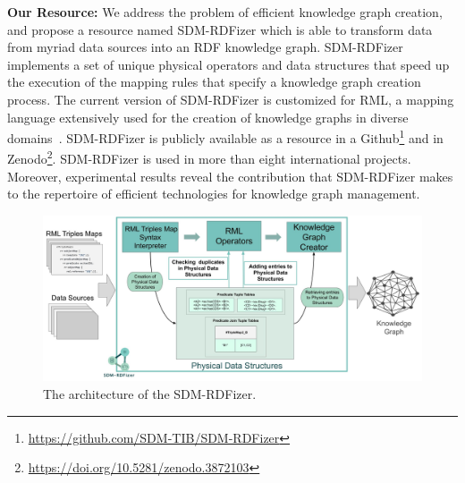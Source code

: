 \textbf{Our Resource:} We address the problem of efficient knowledge graph creation, and propose a resource named SDM-RDFizer which is able to transform data from myriad data sources into an RDF knowledge graph. SDM-RDFizer implements a set of unique physical operators and data structures that speed up the execution of the mapping rules that specify a knowledge graph creation process. The current version of SDM-RDFizer is customized for RML, a mapping language extensively used for the creation of knowledge graphs in diverse domains~\citep{dimou2014rml}.    
SDM-RDFizer is publicly available as a resource in a Github\footnote{\url{https://github.com/SDM-TIB/SDM-RDFizer}} and in Zenodo\footnote{\url{https://doi.org/10.5281/zenodo.3872103}}. SDM-RDFizer is used in more than eight international projects. Moreover, experimental results reveal the contribution that SDM-RDFizer makes to the repertoire of efficient technologies for knowledge graph management.  
\begin{figure}[t!]
    \centering
    \includegraphics[width=1\textwidth]{figures/architecture_v1.1.jpg}
    \caption[SDM-RDFizer architecture]{The architecture of the SDM-RDFizer.}
    \label{fig:architecture}

\end{figure}



